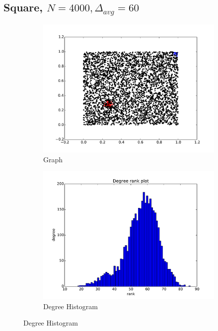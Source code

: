 \documentclass[oneside, titlepage]{scrartcl}
\begin{document}
\subsection{Square, $N=4000, \Delta_{avg}=60$}
\begin{figure}[!h]
\centering
\begin{subfigure}{0.5\textwidth}
	\centering
	\includegraphics[width=0.9\linewidth]{figures/graph3.pdf}
	\caption{Graph}
\end{subfigure}%
\begin{subfigure}{0.5\textwidth}
	\centering
	\includegraphics[width=0.9\linewidth]{figures/degrees3.pdf}
	\caption{Degree Histogram}
\end{subfigure}


\end{figure}
\end{document}
